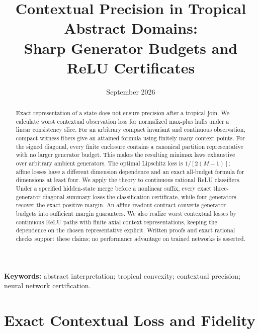 
\title{Contextual Precision in Tropical Abstract Domains:\\Sharp Generator Budgets and ReLU Certificates}

\date{September 2026}

\maketitle
\begin{abstract}
Exact representation of a state does not ensure precision after a tropical join. We calculate worst contextual observation loss for normalized max-plus hulls under a linear consistency slice. For an arbitrary compact invariant and continuous observation, compact witness fibers give an attained formula using finitely many context points. For the signed diagonal, every finite enclosure contains a canonical partition representative with no larger generator budget. This makes the resulting minimax laws exhaustive over arbitrary ambient generators. The optimal Lipschitz loss is $1/[2(M-1)]$; affine losses have a different dimension dependence and an exact all-budget formula for dimensions at least four. We apply the theory to continuous rational ReLU classifiers. Under a specified hidden-state merge before a nonlinear suffix, every exact three-generator diagonal summary loses the classification certificate, while four generators recover the exact positive margin. An affine-readout contract converts generator budgets into sufficient margin guarantees. We also realize worst contextual losses by continuous ReLU paths with finite axial context representations, keeping the dependence on the chosen representative explicit. Written proofs and exact rational checks support these claims; no performance advantage on trained networks is asserted.
\end{abstract}
\noindent\textbf{Keywords:} abstract interpretation; tropical convexity; contextual precision; neural network certification.



\section{Exact Contextual Loss and Fidelity}






\label{end:main}
\clearpage

\clearpage
\appendix
\renewcommand{\theHsection}{appendix.\Alph{section}}
\renewcommand{\theHsubsection}{\theHsection.\arabic{subsection}}






